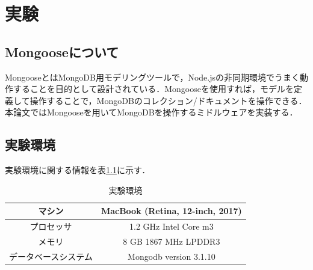 \documentclass[a4paper,11pt]{ujreport}
\begin{document}
\chapter{実験}
\label{chap:Experiment}
\section{Mongooseについて}
MongooseとはMongoDB用モデリングツールで，Node.jsの非同期環境でうまく動作することを目的として設計されている．Mongooseを使用すれば，モデルを定義して操作することで，MongoDBのコレクション/ドキュメントを操作できる\cite{mongoose}．本論文ではMongooseを用いてMongoDBを操作するミドルウェアを実装する．

\section{実験環境}
実験環境に関する情報を表\ref{table:experiment_env}に示す．
\begin{table}[htb]
  \begin{center}
    \caption{実験環境}
		\label{table:experiment_env}
    \begin{tabular}{|c|c|} \hline
      マシン & MacBook (Retina, 12-inch, 2017) \\ \hline
      プロセッサ & 1.2 GHz Intel Core m3\\ \hline
      メモリ & 8 GB 1867 MHz LPDDR3\\ \hline
      データベースシステム & Mongodb version 3.1.10\\ \hline
    \end{tabular}
  \end{center}
\end{table}
\end{document}
